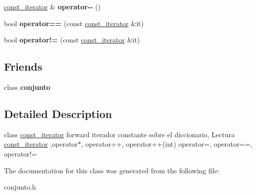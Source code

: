 \begin{DoxyCompactItemize}
\item 
\hypertarget{classconjunto_1_1const__iterator_a304c7e72e7e7a2cd70bd02d7659e0fbc}{\hyperlink{classconjunto_1_1const__iterator}{const\-\_\-iterator} \& {\bfseries operator-\/-\/} ()}\label{classconjunto_1_1const__iterator_a304c7e72e7e7a2cd70bd02d7659e0fbc}

\item 
\hypertarget{classconjunto_1_1const__iterator_a6d2a0501cd5eeea3db0bf9a6a553aa5f}{bool {\bfseries operator==} (const \hyperlink{classconjunto_1_1const__iterator}{const\-\_\-iterator} \&it)}\label{classconjunto_1_1const__iterator_a6d2a0501cd5eeea3db0bf9a6a553aa5f}

\item 
\hypertarget{classconjunto_1_1const__iterator_aea197d9ca07e8451eb857ae84d3796ff}{bool {\bfseries operator!=} (const \hyperlink{classconjunto_1_1const__iterator}{const\-\_\-iterator} \&it)}\label{classconjunto_1_1const__iterator_aea197d9ca07e8451eb857ae84d3796ff}

\end{DoxyCompactItemize}
\subsection*{Friends}
\begin{DoxyCompactItemize}
\item 
\hypertarget{classconjunto_1_1const__iterator_a42fdcda39c77eabd7380e29fcdbe5dd2}{class {\bfseries conjunto}}\label{classconjunto_1_1const__iterator_a42fdcda39c77eabd7380e29fcdbe5dd2}

\end{DoxyCompactItemize}


\subsection{Detailed Description}
class \hyperlink{classconjunto_1_1const__iterator}{const\-\_\-iterator} forward iterador constante sobre el diccionario, Lectura \hyperlink{classconjunto_1_1const__iterator}{const\-\_\-iterator} ,operator$\ast$, operator++, operator++(int) operator=, operator==, operator!= 

The documentation for this class was generated from the following file\-:\begin{DoxyCompactItemize}
\item 
conjunto.\-h\end{DoxyCompactItemize}
